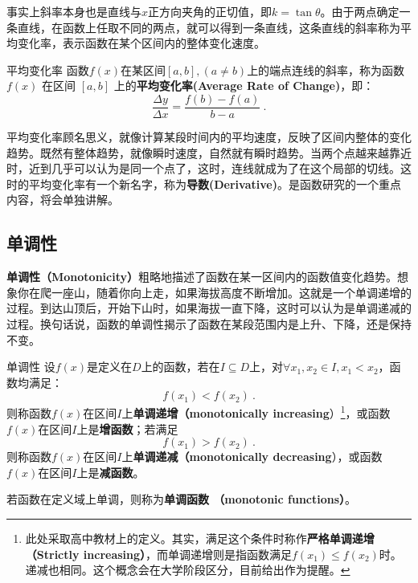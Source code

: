 事实上斜率本身也是直线与$x$正方向夹角的正切值，即$k=\tan\theta$。由于两点确定一条直线，在函数上任取不同的两点，就可以得到一条直线，这条直线的斜率称为平均变化率，表示函数在某个区间内的整体变化速度。

\begin{definition}{平均变化率}
函数$f(x)$在某区间$[a, b],(a\neq b)$上的端点连线的斜率，称为函数 $f(x)$ 在区间 $[a, b]$ 上的\textbf{平均变化率(Average Rate of Change)}，即：
\begin{equation}
\frac{\Delta y}{\Delta x}=\frac{f(b) - f(a)}{b - a}~.
\end{equation}
\end{definition}

平均变化率顾名思义，就像计算某段时间内的平均速度，反映了区间内整体的变化趋势。既然有整体趋势，就像瞬时速度，自然就有瞬时趋势。当两个点越来越靠近时，近到几乎可以认为是同一个点了，这时，连线就成为了在这个局部的切线。这时的平均变化率有一个新名字，称为\textbf{导数(Derivative)}。是函数研究的一个重点内容，将会单独讲解。

\subsection{单调性}\label{sub_HsFunC_1}

\textbf{单调性（Monotonicity）}粗略地描述了函数在某一区间内的函数值变化趋势。想象你在爬一座山，随着你向上走，如果海拔高度不断增加。这就是一个单调递增的过程。到达山顶后，开始下山时，如果海拔一直下降，这时可以认为是单调递减的过程。换句话说，函数的单调性揭示了函数在某段范围内是上升、下降，还是保持不变。

\begin{definition}{单调性}
设$f(x)$是定义在$D$上的函数，若在$I\subseteq D$上，对$\forall x_1,x_2\in I,x_1< x_2$，函数均满足：
\begin{equation}
f(x_1)<f(x_2)~.
\end{equation}
则称函数$f(x)$在区间$I$上\textbf{单调递增（monotonically increasing}）\footnote{此处采取高中教材上的定义。其实，满足这个条件时称作\textbf{严格单调递增 （Strictly increasing）}，而单调递增则是指函数满足$f(x_1)\leq f(x_2)$时。递减也相同。这个概念会在大学阶段区分，目前给出作为提醒。}，或函数$f(x)$在区间$I$上是\textbf{增函数}；若满足
\begin{equation}
f(x_1)>f(x_2)~.
\end{equation}
则称函数$f(x)$在区间$I$上\textbf{单调递减（monotonically decreasing}），或函数$f(x)$在区间$I$上是\textbf{减函数}。

若函数在定义域上单调，则称为\textbf{单调函数 （monotonic functions）}。
\end{definition}

